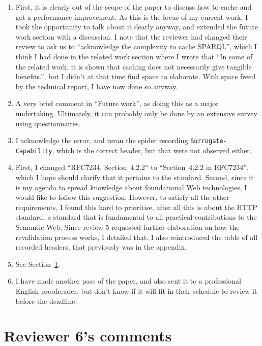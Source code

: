 \documentclass{article}
\newcommand{\httph}[1]{\texttt{#1}}
\begin{document}
\begin{enumerate}
\item First, it is clearly out of the scope of the paper to discuss
  how to cache and get a performance improvement. As this is the focus
  of my current work, I took the opportunity to talk about it dearly
  anyway, and extended the future work section with a discussion. I
  note that the reviewer had changed their review to ask us to
  ``acknowledge the complexity to cache SPARQL'', which I think I had
  done in the related work section where I wrote that ``In some of the
  related work, it is shown that caching does not necessarily give
  tangible benefits.'', but I didn't at that time find space to
  elaborate. With space freed by the technical report, I have now done
  so anyway.

\item A very brief comment in ``Future work'', as doing this as a
  major undertaking. Ultimately, it can probably only be done by an
  extensive survey using questionnaires.

\item I acknowledge the error, and reran the spider recording
  \httph{Surrogate-Capability}, which is the correct header, but that
  were not observed either.

\item First, I changed ``RFC7234, Section~4.2.2'' to ``Section~4.2.2
  in RFC7234'', which I hope should clarify that it pertains to the
  standard. Second, since it is my agenda to spread knowledge about
  foundational Web technologies, I would like to follow this
  suggestion. However, to satisfy all the other requirements, I found
  this hard to prioritise, after all this is about the HTTP standard,
  a standard that is fundamental to all practical contributions to the
  Semantic Web. Since review 5 requested further elaboration on how
  the revalidation process works, I detailed that. I also reintroduced
  the table of all recorded headers, that previously was in the
  appendix.

\item See Section~\ref{rev6}.

\item I have made another pass of the paper, and also sent it to a
  professional English proofreader, but don't know if it will fit in
  their schedule to review it before the deadline.

\end{enumerate}

\section{Reviewer 6's comments}\label{rev6}
\end{document}
